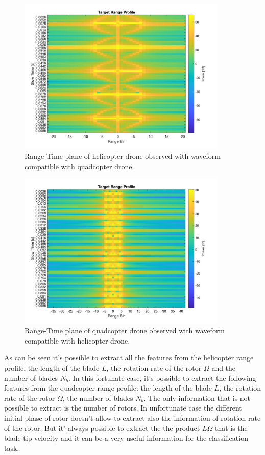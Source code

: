 \begin{figure}[h!]
\centering
\includegraphics[width=10cm]{FMCW mD analysis-chap4/img/range-time_helic_with_unique_wavform.jpg}
\caption{Range-Time plane of helicopter drone observed with waveform compatible with quadcopter drone.}
\label{helic_unique_waveform}
\end{figure}

\begin{figure}[h!]
\centering
\includegraphics[width=10cm]{FMCW mD analysis-chap4/img/range-time_quaad_unique_wave.jpg}
\caption{Range-Time plane of quadcopter drone observed with waveform compatible with helicopter drone.}
\label{quad_unique_waveform}
\end{figure}

As can be seen it's possible to extract all the features from the helicopter range profile, the length of the blade $L$, the rotation rate of the rotor $\Omega$ and the number of blades $N_b$. In this fortunate case, it's possible to extract the following features from the quadcopter range profile: the length of the blade $L$, the rotation rate of the rotor $\Omega$, the number of blades $N_b$. The only information that is not possible to extract is the number of rotors. In unfortunate case the different initial phase of rotor doesn't allow to extract also the information of rotation rate of the rotor. But it' always possible to extract the the product $L\Omega$ that is the blade tip velocity and it can be a very useful information for the classification task. 

